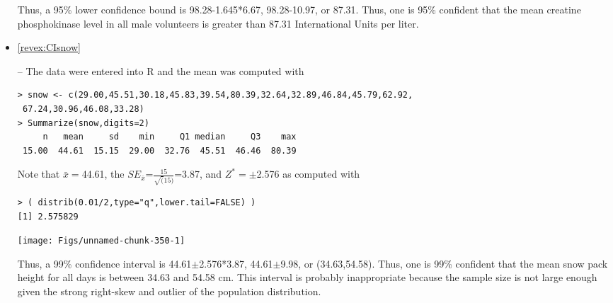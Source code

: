 \documentclass[10pt,openany]{book}\usepackage[]{graphicx}\usepackage[]{color}
\makeatletter
\newenvironment{kframe}{%
 \def\at@end@of@kframe{}%
 \ifinner\ifhmode%
  \def\at@end@of@kframe{\end{minipage}}%
  \begin{minipage}{\columnwidth}%
 \fi\fi%
 \def\FrameCommand##1{\hskip\@totalleftmargin \hskip-\fboxsep
 \colorbox{shadecolor}{##1}\hskip-\fboxsep
     \hskip-\linewidth \hskip-\@totalleftmargin \hskip\columnwidth}%
 \MakeFramed {\advance\hsize-\width
   \@totalleftmargin\z@ \linewidth\hsize
   \@setminipage}}%
 {\par\unskip\endMakeFramed%
 \at@end@of@kframe}
\newenvironment{knitrout}{}{} %
\makeatother
\begin{document}
\begin{itemize}
\begin{knitrout}
\end{knitrout}
Thus, a 95\% lower confidence bound is 98.28-1.645*6.67, 98.28-10.97, or 87.31.  Thus, one is 95\% confident that the mean creatine phosphokinase level in all male volunteers is greater than 87.31 International Units per liter.
  \item \hypertarget{ans:CIsnow}{\ref{revex:CIsnow}} -- The data were entered into R and the mean was computed with
\begin{knitrout}
\color{fgcolor}\begin{kframe}
\begin{verbatim}
> snow <- c(29.00,45.51,30.18,45.83,39.54,80.39,32.64,32.89,46.84,45.79,62.92,
 67.24,30.96,46.08,33.28)
> Summarize(snow,digits=2)
     n   mean     sd    min     Q1 median     Q3    max 
 15.00  44.61  15.15  29.00  32.76  45.51  46.46  80.39 
\end{verbatim}
\end{kframe}
\end{knitrout}

Note that $\bar{x}=$44.61, the $SE_{\bar{x}}$=$\frac{15}{\sqrt(15)}$=3.87, and $Z^{*}=\pm$2.576 as computed with
\begin{knitrout}
\color{fgcolor}\begin{kframe}
\begin{verbatim}
> ( distrib(0.01/2,type="q",lower.tail=FALSE) )
[1] 2.575829
\end{verbatim}
\end{kframe}

{\centering \texttt{[image: Figs/unnamed-chunk-350-1]} 

}



\end{knitrout}
Thus, a 99\% confidence interval is 44.61$\pm$2.576*3.87, 44.61$\pm$9.98, or (34.63,54.58).  Thus, one is 99\% confident that the mean snow pack height for all days is between 34.63 and 54.58 cm.  This interval is probably inappropriate because the sample size is not large enough given the strong right-skew and outlier of the population distribution.


\end{itemize}
\end{document}
